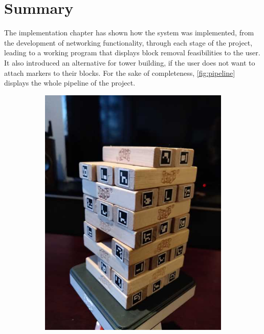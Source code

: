 \section{Summary}

The implementation chapter has shown how the system was implemented, from the development of networking functionality, through each stage of the project, leading to a working program that displays block removal feasibilities to the user. It also introduced an alternative for tower building, if the user does not want to attach markers to their blocks. For the sake of completeness, \cref{fig:pipeline} displays the whole pipeline of the project.

\begin{figure}[p] %

\hspace*{\fill}
\begin{subfigure}{0.3\textwidth}
\includegraphics[angle=270,origin=c,width=\linewidth,keepaspectratio]{images/implementation/tower}

\end{subfigure}
\end{figure}
